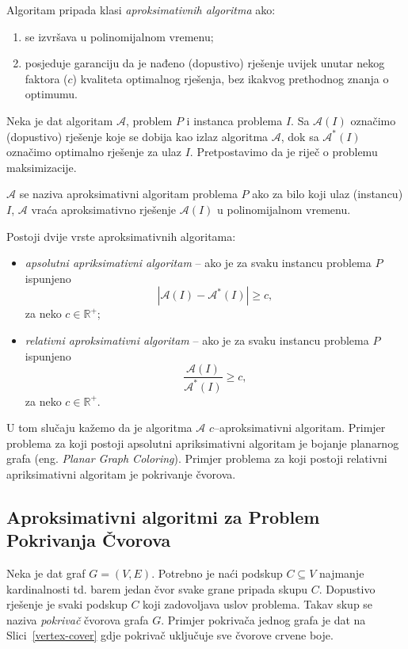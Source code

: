 \documentclass[a4paper, utf8, 11pt, colorlinks]{book}
\begin{document}
  \noindent Algoritam pripada klasi \emph{aproksimativnih algoritma} ako:
  \begin{enumerate}
  	\item se izvršava u polinomijalnom vremenu;
  	\item posjeduje garanciju da je nađeno (dopustivo) rješenje uvijek unutar nekog faktora ($c$) kvaliteta optimalnog rješenja, bez ikakvog prethodnog znanja o optimumu.
  \end{enumerate}
  Neka je dat algoritam $\mathcal{A}$, problem $P$ i instanca problema $I$. Sa $\mathcal{A}(I)$ označimo (dopustivo) rješenje koje se dobija kao izlaz algoritma $\mathcal{A}$, dok sa $\mathcal{A}^*(I)$ označimo optimalno rješenje za ulaz $I$. Pretpostavimo da je riječ o problemu maksimizacije. 
  
  $\mathcal{A}$ se naziva aproksimativni algoritam problema $P$ ako 
  za bilo koji ulaz (instancu) $I$, $\mathcal{A}$ vraća aproksimativno rješenje $\mathcal{A}(I)$ u polinomijalnom vremenu. 
  
  Postoji dvije vrste aproksimativnih algoritama:
  \begin{itemize}
  	\item \emph{apsolutni apriksimativni algoritam} -- ako je za svaku instancu problema $P$ ispunjeno
  	$$ |\mathcal{A}(I) - \mathcal{A}^*(I)| \geq c,$$ za neko $c\in \mathbb{R}^+$;
  	\item \emph{relativni aproksimativni algoritam} -- ako je   za svaku instancu problema $P$ ispunjeno
  	$$\frac{\mathcal{A}(I)}{\mathcal{A}^*(I)} \geq c,$$ za neko $c\in \mathbb{R}^+$.
  \end{itemize}
  
  \noindent U tom slučaju kažemo da je algoritma $\mathcal{A}$ $c$--aproksimativni algoritam.
  Primjer problema za koji postoji apsolutni apriksimativni algoritam je bojanje planarnog grafa (eng. \emph{Planar Graph Coloring}). Primjer problema za koji postoji relativni apriksimativni algoritam je pokrivanje čvorova. 
  
  \subsection{Aproksimativni algoritmi za Problem Pokrivanja Čvorova}
  
  Neka je dat graf $G=(V,E)$. Potrebno je naći podskup $C\subseteq V$ najmanje kardinalnosti td. barem jedan čvor svake grane pripada skupu $C$.  Dopustivo rješenje je svaki podskup $C$ koji zadovoljava uslov problema. Takav skup se naziva \emph{pokrivač} čvorova grafa $G$. Primjer pokrivača jednog grafa je dat na Slici~\ref{vertex-cover} gdje pokrivač uključuje sve čvorove crvene boje. 
  
\end{document}
